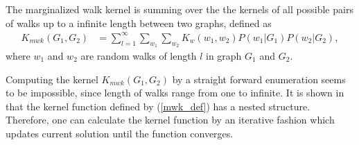 \documentclass[english]{tktltiki}
\begin{document}
The marginalized walk kernel is summing over the the kernels of all possible pairs of walks up to a infinite length between two graphs, defined as
\begin{align}
K_{mwk}(G_1, G_2) &= \sum_{l=1}^{\infty}\sum_{w_1}\sum_{w_2}{K_w(w_1,w_2)P(w_1|G_1)P(w_2|G_2)},
\label{mwk_def}
\end{align}
where $w_1$ and $w_2$ are random walks of length $l$ in graph $G_1$ and $G_2$.

Computing the kernel $K_{mwk}(G_1, G_2)$ by a straight forward enumeration seems to be impossible, since length of walks range from one to infinite. It is shown in \cite{kashima03} that the kernel function defined by (\ref{mwk_def}) has a nested structure. Therefore, one can calculate the kernel function by an iterative fashion which updates current solution until the function converges.

\end{document}
